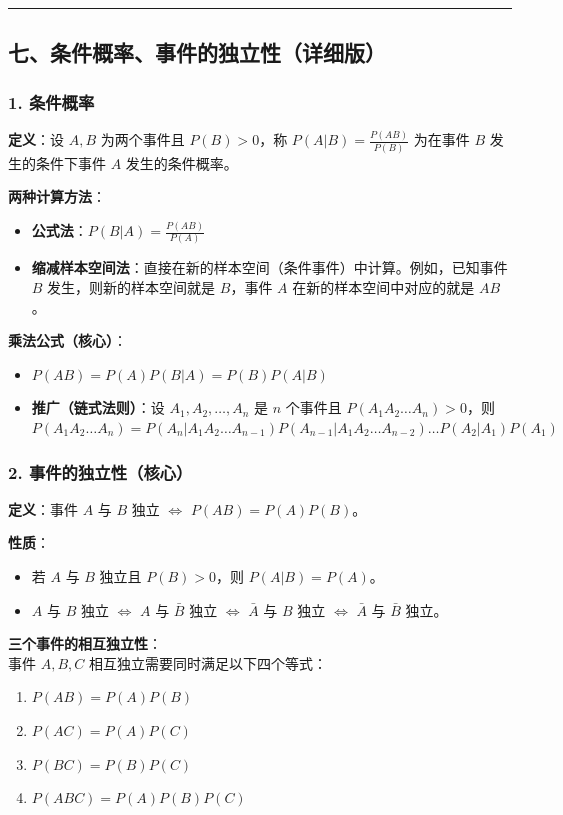 \documentclass[12pt,a4paper]{ctexart}
\begin{document}
\vspace{1em}\hrule\vspace{1em}

\subsection{七、条件概率、事件的独立性（详细版）}

\subsubsection{1. 条件概率}
\textbf{定义}：设 $A, B$ 为两个事件且 $P(B) > 0$，称 $P(A|B) = \frac{P(AB)}{P(B)}$ 为在事件 $B$ 发生的条件下事件 $A$ 发生的条件概率。

\textbf{两种计算方法}：
\begin{itemize}[noitemsep]
    \item \textbf{公式法}：$P(B|A) = \frac{P(AB)}{P(A)}$
    \item \textbf{缩减样本空间法}：直接在新的样本空间（条件事件）中计算。例如，已知事件 $B$ 发生，则新的样本空间就是 $B$，事件 $A$ 在新的样本空间中对应的就是 $AB$。
\end{itemize}

\textbf{乘法公式（核心）}：
\begin{itemize}[noitemsep]
    \item $P(AB) = P(A)P(B|A) = P(B)P(A|B)$
    \item \textbf{推广（链式法则）}：设 $A_1, A_2, \dots, A_n$ 是 $n$ 个事件且 $P(A_1 A_2 \dots A_n) > 0$，则\\
          $P(A_1 A_2 \dots A_n) = P(A_n | A_1 A_2 \dots A_{n-1}) P(A_{n-1} | A_1 A_2 \dots A_{n-2}) \dots P(A_2 | A_1) P(A_1)$
\end{itemize}

\subsubsection{2. 事件的独立性（核心）}
\textbf{定义}：事件 $A$ 与 $B$ 独立 $\iff$ $P(AB) = P(A)P(B)$。

\textbf{性质}：
\begin{itemize}[noitemsep]
    \item 若 $A$ 与 $B$ 独立且 $P(B) > 0$，则 $P(A|B) = P(A)$。
    \item $A$ 与 $B$ 独立 $\iff$ $A$ 与 $\bar{B}$ 独立 $\iff$ $\bar{A}$ 与 $B$ 独立 $\iff$ $\bar{A}$ 与 $\bar{B}$ 独立。
\end{itemize}

\textbf{三个事件的相互独立性}：\\
事件 $A, B, C$ 相互独立需要同时满足以下四个等式：
\begin{enumerate}[noitemsep]
    \item $P(AB) = P(A)P(B)$
    \item $P(AC) = P(A)P(C)$
    \item $P(BC) = P(B)P(C)$
    \item $P(ABC) = P(A)P(B)P(C)$
\end{enumerate}
\end{document}
